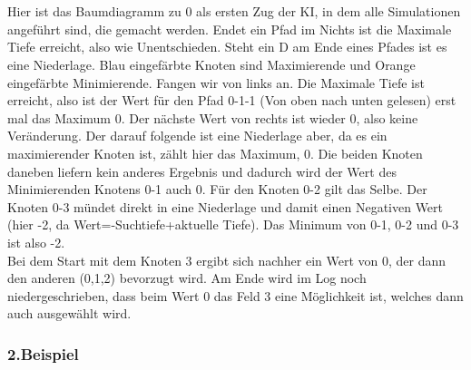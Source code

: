 \documentclass[12pt,a4paper,ngerman]{article}
\begin{document}
	\\\\
	Hier ist das Baumdiagramm zu 0 als ersten Zug der KI, in dem alle Simulationen angeführt sind, die gemacht werden. Endet ein Pfad im Nichts ist die Maximale Tiefe erreicht, also wie Unentschieden. Steht ein D am Ende eines Pfades ist es eine Niederlage. Blau eingefärbte Knoten sind Maximierende und Orange eingefärbte Minimierende. Fangen wir von links an. Die Maximale Tiefe ist erreicht, also ist der Wert für den Pfad 0-1-1 (Von oben nach unten gelesen) erst mal das Maximum 0. Der nächste Wert von rechts ist wieder 0, also keine Veränderung. Der darauf folgende ist eine Niederlage aber, da es ein maximierender Knoten ist, zählt hier das Maximum, 0. Die beiden Knoten daneben liefern kein anderes Ergebnis und dadurch wird der Wert des Minimierenden Knotens 0-1 auch 0. Für den Knoten 0-2 gilt das Selbe. Der Knoten 0-3 mündet direkt in eine Niederlage und damit einen Negativen Wert (hier -2, da Wert=-Suchtiefe+aktuelle Tiefe). Das Minimum von 0-1, 0-2 und 0-3 ist also -2.\\
	Bei dem Start mit dem Knoten 3 ergibt sich nachher ein Wert von 0, der dann den anderen (0,1,2) bevorzugt wird. Am Ende wird im Log noch niedergeschrieben, dass beim Wert 0 das Feld 3 eine Möglichkeit ist, welches dann auch ausgewählt wird.
	\subsubsection{2.Beispiel}
\end{document}
